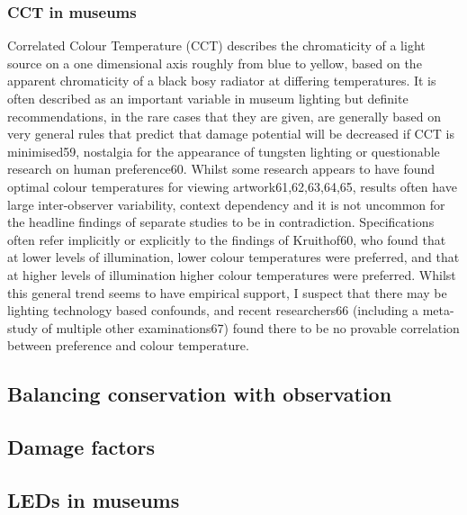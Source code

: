 \subsubsection{CCT in museums}

Correlated Colour Temperature (CCT) describes the chromaticity of a light source on a one dimensional axis roughly from blue to yellow, based on the apparent chromaticity of a black bosy radiator at differing temperatures. It is often described as an important variable in museum lighting but definite recommendations, in the rare cases that they are given, are generally based on very general rules that predict that damage potential will be decreased if CCT is minimised59, nostalgia for the appearance of tungsten lighting or questionable research on human preference60. Whilst some research appears to have found optimal colour temperatures for viewing artwork61,62,63,64,65, results often have large inter-observer variability, context dependency and it is not uncommon for the headline findings of separate studies to be in contradiction. 
Specifications often refer implicitly or explicitly to the findings of Kruithof60, who found that at lower levels of illumination, lower colour temperatures were preferred, and that at higher levels of illumination higher colour temperatures were preferred. Whilst this general trend seems to have empirical support, I suspect that there may be lighting technology based confounds, and recent researchers66 (including a meta-study of multiple other examinations67) found there to be no provable correlation between preference and colour temperature.


\subsection{Balancing conservation with observation}
\subsection{Damage factors}
\subsection{LEDs in museums}


